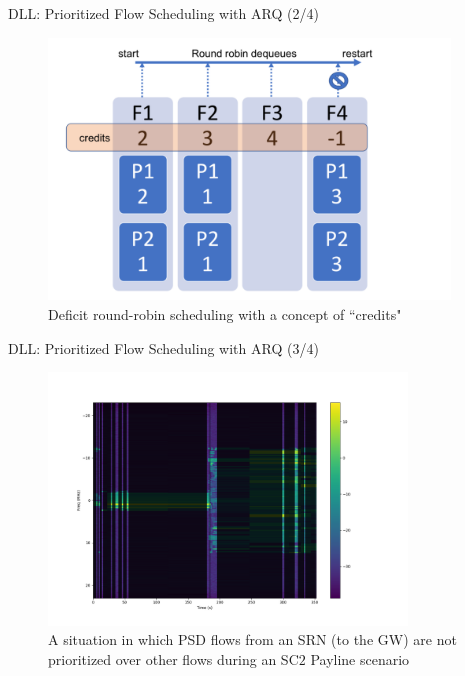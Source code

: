 \documentclass{beamer}
\begin{document}
\begin{frame}{DLL: Prioritized Flow Scheduling with ARQ (2/4)}
\begin{figure}
    \centering
    \includegraphics[width = 0.95\textwidth]{Deficit_Round_Robin_Scheduling.PNG}
    \caption{Deficit round-robin scheduling with a concept of ``credits"}
    \label{fig:11}
\end{figure}
\end{frame}
\begin{frame}{DLL: Prioritized Flow Scheduling with ARQ (3/4)}
\begin{figure}
    \centering
    \includegraphics[width = 0.85\textwidth]{PSD_without_fix_payline.png}
    \caption{A situation in which PSD flows from an SRN (to the GW) are not prioritized over other flows during an SC$2$ Payline scenario}
    \label{fig:12}
\end{figure}
\end{frame}
\end{document}
